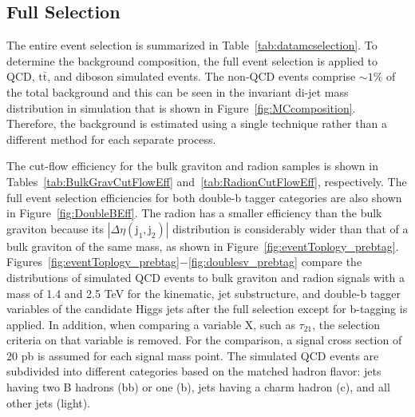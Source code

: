 \subsection{Full Selection}

The entire event selection is summarized in Table~\ref{tab:datamcselection}. To determine the background composition, the full event selection is applied to QCD, $\mathrm{t\bar{t}}$, and diboson simulated events. The non-QCD events comprise ${\sim}1\%$ of the total background and this can be seen in the invariant di-jet mass distribution in simulation that is shown in Figure~\ref{fig:MCcomposition}. Therefore, the background is estimated using a single technique rather than a different method for each separate process.

The cut-flow efficiency for the bulk graviton and radion samples is shown in Tables~\ref{tab:BulkGravCutFlowEff} and~\ref{tab:RadionCutFlowEff}, respectively. The full event selection efficiencies for both double-b tagger categories are also shown in Figure~\ref{fig:DoubleBEff}. The radion has a smaller efficiency than the bulk graviton because its $|\Delta\eta(\mathrm{j}_{1}, \mathrm{j}_{2})|$ distribution is considerably wider than that of a bulk graviton of the same mass, as shown in Figure~\ref{fig:eventToplogy_prebtag}. Figures~\ref{fig:eventToplogy_prebtag}$-$\ref{fig:doublesv_prebtag} compare the distributions of simulated QCD events to bulk graviton and radion signals with a mass of 1.4 and 2.5 TeV for the kinematic, jet substructure, and double-b tagger variables of the candidate Higgs jets after the full selection except for b-tagging is applied. In addition, when comparing a variable X, such as $\tau_{21}$, the selection criteria on that variable is removed. For the comparison, a signal cross section of 20 pb is assumed for each signal mass point. The simulated QCD events are subdivided into different categories based on the matched hadron flavor: jets having two B hadrons (bb) or one (b), jets having a charm hadron (c), and all other jets (light). 



